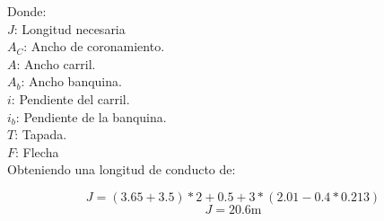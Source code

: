 \documentclass[../main.tex]{subfiles}
\begin{document}
Donde: \\
$J$: Longitud necesaria\\
$A_C$: Ancho de coronamiento. \\
$A$: Ancho carril. \\
$A_b$: Ancho banquina.\\
$i$: Pendiente del carril. \\
$i_b$: Pendiente de la banquina.\\
$T$: Tapada.\\
$F$: Flecha \\


Obteniendo una longitud de conducto de: 

\begin{equation}
    J =  (3.65+3.5)*2 + 0.5 + 3*(2.01-0.4*0.213)
\end{equation}
\begin{equation}
    J =  20.6 \text{m}
\end{equation}
\end{document}
